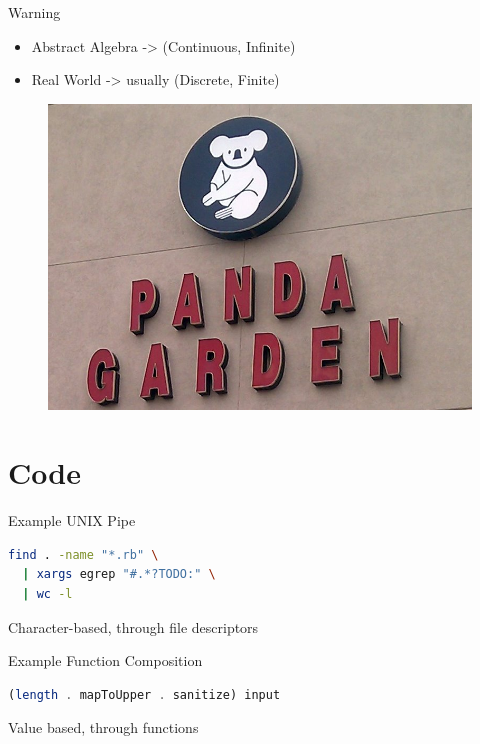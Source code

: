 \documentclass[compress]{beamer}
\begin{document}
\begin{frame}{Warning}
  \begin{itemize}
    \item \Large{Abstract Algebra -> (Continuous, Infinite)} \newline
    \item \Large{Real World -> usually (Discrete, Finite)}
  \end{itemize}
\end{frame}

\begin{frame}
  \begin{figure}
    \centering
    \includegraphics[width=\linewidth]{assets/panda_garden_fail.jpg}
  \end{figure}
\end{frame}

\section{Code}

\begin{frame}[containsverbatim]{Example UNIX Pipe}
\begin{lstlisting}[language=bash]
find . -name "*.rb" \
  | xargs egrep "#.*?TODO:" \
  | wc -l
\end{lstlisting}
  \small{Character-based, through file descriptors}
\end{frame}

\begin{frame}[containsverbatim]{Example Function Composition}
\begin{lstlisting}[language=haskell]
(length . mapToUpper . sanitize) input
\end{lstlisting}
  \small{Value based, through functions}
\end{frame}
\end{document}
